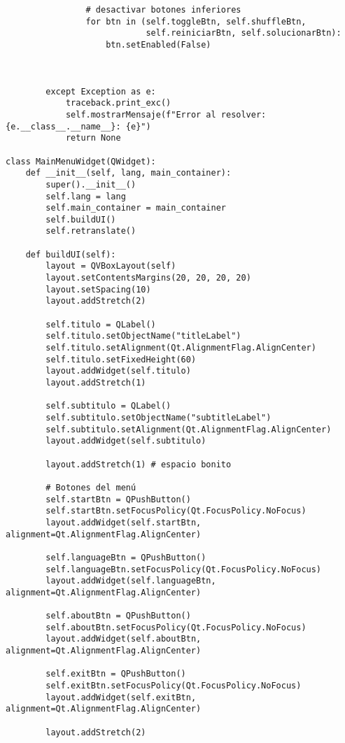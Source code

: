 \begin{lstlisting}
                # desactivar botones inferiores
                for btn in (self.toggleBtn, self.shuffleBtn,
                            self.reiniciarBtn, self.solucionarBtn):
                    btn.setEnabled(False)

                
            
        except Exception as e:
            traceback.print_exc()
            self.mostrarMensaje(f"Error al resolver: {e.__class__.__name__}: {e}")
            return None

class MainMenuWidget(QWidget):
    def __init__(self, lang, main_container):
        super().__init__()
        self.lang = lang
        self.main_container = main_container
        self.buildUI()
        self.retranslate()
        
    def buildUI(self):
        layout = QVBoxLayout(self)
        layout.setContentsMargins(20, 20, 20, 20)
        layout.setSpacing(10)
        layout.addStretch(2)

        self.titulo = QLabel()
        self.titulo.setObjectName("titleLabel")
        self.titulo.setAlignment(Qt.AlignmentFlag.AlignCenter)
        self.titulo.setFixedHeight(60)
        layout.addWidget(self.titulo)
        layout.addStretch(1) 
        
        self.subtitulo = QLabel()
        self.subtitulo.setObjectName("subtitleLabel")
        self.subtitulo.setAlignment(Qt.AlignmentFlag.AlignCenter)
        layout.addWidget(self.subtitulo)
        
        layout.addStretch(1) # espacio bonito
        
        # Botones del menú
        self.startBtn = QPushButton()
        self.startBtn.setFocusPolicy(Qt.FocusPolicy.NoFocus)
        layout.addWidget(self.startBtn, alignment=Qt.AlignmentFlag.AlignCenter)

        self.languageBtn = QPushButton()
        self.languageBtn.setFocusPolicy(Qt.FocusPolicy.NoFocus)
        layout.addWidget(self.languageBtn, alignment=Qt.AlignmentFlag.AlignCenter)

        self.aboutBtn = QPushButton()
        self.aboutBtn.setFocusPolicy(Qt.FocusPolicy.NoFocus)
        layout.addWidget(self.aboutBtn, alignment=Qt.AlignmentFlag.AlignCenter)
        
        self.exitBtn = QPushButton()
        self.exitBtn.setFocusPolicy(Qt.FocusPolicy.NoFocus)
        layout.addWidget(self.exitBtn, alignment=Qt.AlignmentFlag.AlignCenter)

        layout.addStretch(2)
        

\end{lstlisting}
